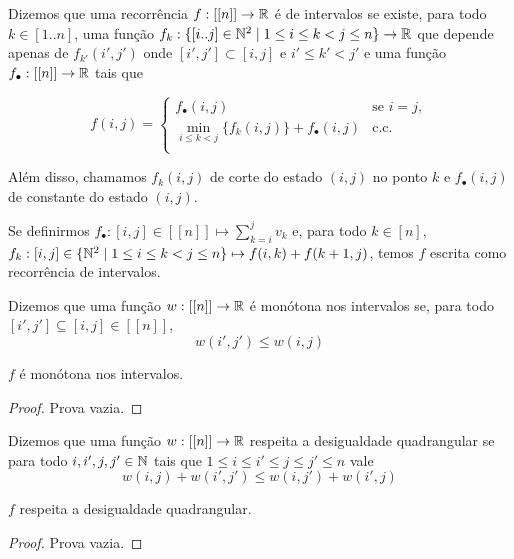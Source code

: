 \begin{defi} \label{rec_int}
Dizemos que uma recorrência $f : [[n]] \to \mathbb{R}$ é de intervalos se existe, para todo $k \in [1..n]$, uma função $f_k : \{[i..j] \in \mathbb{N}^2 \mid 1 \leq i \leq k < j \leq n \} \to \mathbb{R}$ que depende apenas de $f_{k'}(i',j')$ onde $[i',j'] \subset [i,j]$ e $i' \leq k' < j'$ e uma função $f_\bullet : [[n]] \to \mathbb{R}$ tais que

$$
f(i,j) = \begin{cases}
    f_\bullet (i,j) & \text{se } i = j, \\
    \min\limits_{i \leq k < j} \Big\{ f_k(i,j) \Big\} + f_\bullet (i,j) & \text{c.c.} \\
\end{cases}
$$

Além disso, chamamos $f_k(i,j)$ de corte do estado $(i,j)$ no ponto $k$ e $f_\bullet(i,j)$ de constante do estado $(i,j)$.
\end{defi}

Se definirmos $f_\bullet : [i,j] \in [[n]] \mapsto \sum\limits_{k=i}^j v_k$ e, para todo $k \in [n]$, $f_k : [i,j] \in \{ \mathbb{N}^2 \mid 1 \leq i \leq k < j \leq n \} \mapsto f(i,k) + f(k+1,j)$, temos $f$ escrita como recorrência de intervalos.

\begin{defi} \label{mon_int}
Dizemos que uma função $w : [[n]] \to \mathbb{R}$ é monótona nos intervalos se, para todo $[i',j'] \subseteq [i,j] \in [[n]]$,
$$ w(i',j') \leq w(i,j) $$
\end{defi}

\begin{prop}
$f$ é monótona nos intervalos.
\end{prop}

\begin{proof}
Prova vazia.
\end{proof}

\begin{defi} \label{qi}
Dizemos que uma função $w : [[n]] \to \mathbb{R}$ respeita a desigualdade quadrangular se para todo $i,i',j,j' \in \mathbb{N}$ tais que $1 \leq i \leq i' \leq j \leq j' \leq n$ vale
$$ w(i,j) + w(i',j') \leq w(i,j') + w(i',j) $$
\end{defi}

\begin{prop}
$f$ respeita a desigualdade quadrangular.
\end{prop}

\begin{proof}
Prova vazia.
\end{proof}

